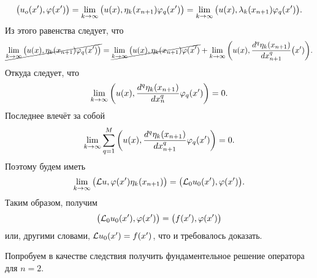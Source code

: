 \begin{Proof}
	\[
		\big(u_o(x'),\varphi(x')\big) = \lim\limits_{k\rightarrow\infty}\big(u(x),\eta_k(x_{n+1})\varphi_q(x')\big) = \lim\limits_{k\rightarrow\infty}\big(u(x),\lambda_k(x_{n+1})\varphi_q(x')\big).
	\]
	Из этого равенства следует, что
	\[
		\cancel{\lim\limits_{k\rightarrow\infty}\big(u(x),\eta_k(x_{n+1})\varphi_q(x')\big)} = \cancel{\lim\limits_{k\rightarrow\infty}\big(u(x),\eta_k(x_{n+1})\varphi(x')} + \lim\limits_{k\rightarrow\infty}\bigg(u(x),\frac{d^q\eta_k(x_{n+1})}{dx_{n+1}^q}\big(x')\bigg).
	\]
	Откуда следует, что
	\[
		\lim\limits_{k\rightarrow\infty}\bigg( u(x),\frac{d^q\eta_k(x_{n+1})}{dx_n^q}\varphi_q(x')\bigg) = 0.
	\]
	Последнее влечёт за собой
	\[
		\lim\limits_{k\rightarrow\infty} \sum\limits_{q = 1}^{M}\bigg(u(x),\frac{d^q\eta_k(x_{n+1})}{dx^q_{n+1}}\varphi_q(x')\bigg) = 0.
	\]
	Поэтому будем иметь
	\[
		\lim\limits_{k\rightarrow\infty}\big(\mathcal L u,\varphi(x')\eta_k(x_{n+1})\big) = \big(\mathcal L_0 u_0(x'),\varphi(x')\big).
	\]
	Таким образом, получим
	\[
		\big(\mathcal L_0 u_0(x'),\varphi(x')\big) = \big(f(x'),\varphi(x')\big)
	\]
	или, другими словами, $\mathcal L u_0(x') = f(x')$, что и требовалось доказать.
\end{Proof}

Попробуем в качестве следствия получить фундаментельное решение оператора для $n=2$.
